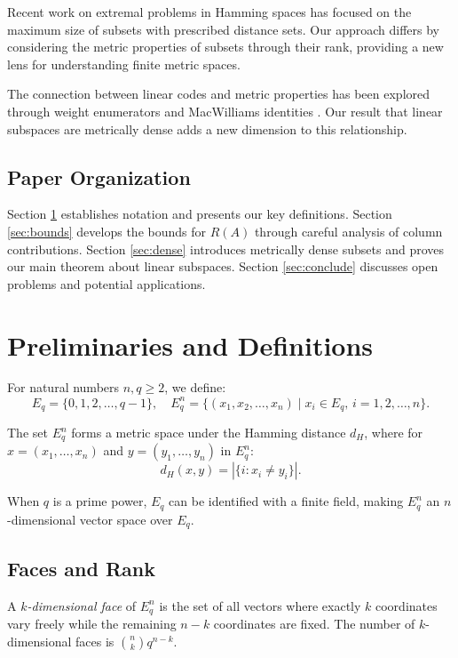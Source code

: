 \documentclass[12pt]{article}
\newcommand{\Eq}{E_q}
\newcommand{\Eqn}{E_q^n}
\renewcommand{\geq}{\geqslant}
\begin{document}
Recent work on extremal problems in Hamming spaces \cite{ahlswede1997contributions,frankl1995extremal} has focused on the maximum size of subsets with prescribed distance sets. Our approach differs by considering the metric properties of subsets through their rank, providing a new lens for understanding finite metric spaces.

The connection between linear codes and metric properties has been explored through weight enumerators and MacWilliams identities \cite{macwilliams1962theorem}. Our result that linear subspaces are metrically dense adds a new dimension to this relationship.

\subsection{Paper Organization}

Section \ref{sec:prelim} establishes notation and presents our key definitions. Section \ref{sec:bounds} develops the bounds for $R(A)$ through careful analysis of column contributions. Section \ref{sec:dense} introduces metrically dense subsets and proves our main theorem about linear subspaces. Section \ref{sec:conclude} discusses open problems and potential applications.

\section{Preliminaries and Definitions}
\label{sec:prelim}

For natural numbers $n, q \geq 2$, we define:
\[
\Eq = \{0, 1, 2, \ldots, q - 1\}, \quad \Eqn = \{(x_1, x_2, \ldots, x_n) \mid x_i \in \Eq, \, i = 1, 2, \ldots, n\}.
\]

The set $\Eqn$ forms a metric space under the Hamming distance $d_H$, where for $x = (x_1, \ldots, x_n)$ and $y = (y_1, \ldots, y_n)$ in $\Eqn$:
\[
d_H(x, y) = |\{i : x_i \neq y_i\}|.
\]

When $q$ is a prime power, $\Eq$ can be identified with a finite field, making $\Eqn$ an $n$-dimensional vector space over $\Eq$.

\subsection{Faces and Rank}

A \emph{$k$-dimensional face} of $\Eqn$ is the set of all vectors where exactly $k$ coordinates vary freely while the remaining $n-k$ coordinates are fixed. The number of $k$-dimensional faces is $\binom{n}{k}q^{n-k}$.
\end{document}

